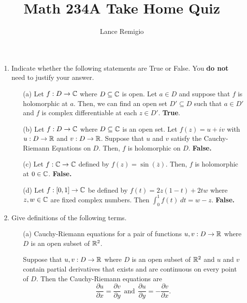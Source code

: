 \documentclass[a4paper]{article}
\title{Math 234A Take Home Quiz}
\author{Lance Remigio}
\begin{document}
\maketitle   

\begin{enumerate}
    \item Indicate whether the following statements are True or False. You \textbf{do not} need to justify your answer.
        \begin{enumerate}
            \item[(a)] Let \( f: D \to \mathbb{C}  \) where \( D \subseteq  \mathbb{C}   \) is open. Let \( a \in D  \) and suppose that \( f  \) is holomorphic at \( a  \). Then, we can find an open set \( D' \subseteq D  \) such that \( a \in D' \) and \( f  \) is complex differentiable at each \( z \in D' \). \textbf{True}. 
            \item[(b)] Let \( f: D \to \mathbb{C}  \) where \( D \subseteq  \mathbb{C}   \) is an open set. Let \( f(z) = u + iv \) with \( u: D \to \mathbb{R}  \) and \( v : D \to \mathbb{R}  \). Suppose that \( u  \) and \( v  \) satisfy the Cauchy-Riemann Equations on \( D  \). Then, \( f  \) is holomorphic on \( D  \). \textbf{False.}
            \item[(c)] Let \( f: \mathbb{C} \to \mathbb{C}  \) defined by \( f(z) = \sin (\overline{z}) \). Then, \( f  \) is holomorphic at \( 0 \in \mathbb{C}  \). \textbf{False.}
            \item[(d)] Let \( f: [0,1] \to \mathbb{C}  \) be defined by \( f(t) = 2z(1-t) + 2tw \) where \( z,w \in \mathbb{C}  \) are fixed complex numbers. Then \( \int_{ 0 }^{ 1 } f(t) \ dt = w - z  \). \textbf{False.}
        \end{enumerate}
    \item Give definitions of the following terms.
        \begin{enumerate}
            \item[(a)] Cauchy-Riemann equations for a pair of functions \( u,v: D \to \mathbb{R}  \) where \( D  \) is an open subset of \( \mathbb{R}^{2} \).
                \begin{solution}
                Suppose that \( u,v : D \to \mathbb{R}  \) where \( D  \) is an open subset of \( \mathbb{R}^{2} \) and \( u \) and \( v  \) contain partial derivatives that exists and are continuous on every point of \( D  \). Then the Cauchy-Riemann equations are
                \[  \frac{ \partial u  }{ \partial x  }  = \frac{ \partial v }{ \partial y } \ \ \text{and} \ \ \frac{ \partial u }{  \partial y  }  = -\frac{ \partial v   }{ \partial x   }.  \]
                \end{solution}

\end{enumerate}
\end{enumerate}
\end{document}
